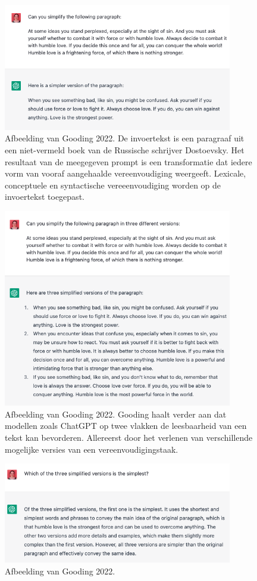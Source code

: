 \begin{figure}[H]
	\includegraphics[width=10cm]{img/chatgpt-example-simplification-gooding.png}
	\caption{Afbeelding van Gooding 2022. De invoertekst is een paragraaf uit een niet-vermeld boek van de Russische schrijver Dostoevsky. Het resultaat van de meegegeven prompt is een transformatie dat iedere vorm van vooraf aangehaalde vereenvoudiging weergeeft. Lexicale, conceptuele en syntactische vereeenvoudiging worden op de invoertekst toegepast.}
\end{figure}

\begin{figure}[H]
	\includegraphics[width=10cm]{img/chatgpt-example-different-versions-gooding.png}
	\caption{Afbeelding van Gooding 2022. Gooding haalt verder aan dat modellen zoals ChatGPT op twee vlakken de leesbaarheid van een tekst kan bevorderen. Allereerst door het verlenen van verschillende mogelijke versies van een vereenvoudigingstaak.}
\end{figure}

\begin{figure}[H]
	\includegraphics[width=10cm]{img/chatgpt-example-evaluation-gooding.png}
	\caption{Afbeelding van Gooding 2022.}
\end{figure}

